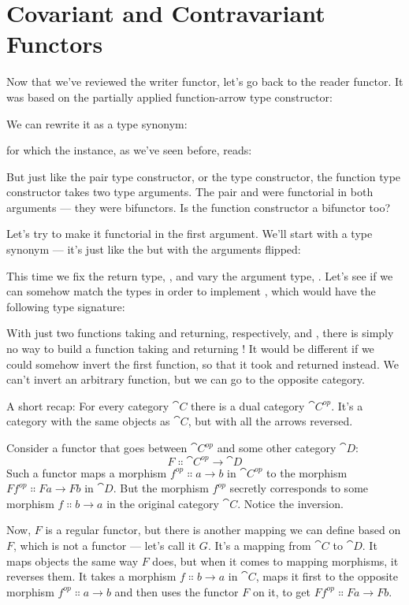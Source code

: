 \section{Covariant and Contravariant Functors}

Now that we've reviewed the writer functor, let's go back to the reader
functor. It was based on the partially applied function-arrow type
constructor:

We can rewrite it as a type synonym:

for which the  instance, as we've seen before, reads:

But just like the pair type constructor, or the  type
constructor, the function type constructor takes two type arguments. The
pair and  were functorial in both arguments --- they were
bifunctors. Is the function constructor a bifunctor too?

Let's try to make it functorial in the first argument. We'll start with
a type synonym --- it's just like the  but with the
arguments flipped:

This time we fix the return type, , and vary the argument
type, . Let's see if we can somehow match the types in order
to implement , which would have the following type
signature:

With just two functions taking  and returning, respectively,
 and , there is simply no way to build a function
taking  and returning ! It would be different if we
could somehow invert the first function, so that it took  and
returned  instead. We can't invert an arbitrary function, but
we can go to the opposite category.

A short recap: For every category $\cat{C}$ there is a dual category
$\cat{C}^\mathit{op}$. It's a category with the same objects as
$\cat{C}$, but with all the arrows reversed.

Consider a functor that goes between $\cat{C}^\mathit{op}$ and
some other category $\cat{D}$:
\[F \Colon \cat{C}^\mathit{op} \to \cat{D}\]
Such a functor maps a morphism $f^\mathit{op} \Colon a \to b$ in
$\cat{C}^\mathit{op}$ to the morphism $F f^\mathit{op} \Colon F a \to F b$ in $\cat{D}$. But the morphism
$f^\mathit{op}$ secretly corresponds to some morphism
$f \Colon b \to a$ in the original category $\cat{C}$. Notice the
inversion.

Now, $F$ is a regular functor, but there is another mapping we can
define based on $F$, which is not a functor --- let's call it
$G$. It's a mapping from $\cat{C}$ to $\cat{D}$. It maps objects the
same way $F$ does, but when it comes to mapping morphisms, it
reverses them. It takes a morphism $f \Colon b \to a$ in $\cat{C}$, maps
it first to the opposite morphism $f^\mathit{op} \Colon a \to b$
and then uses the functor $F$ on it, to get $F f^\mathit{op} \Colon F a \to F b$.

